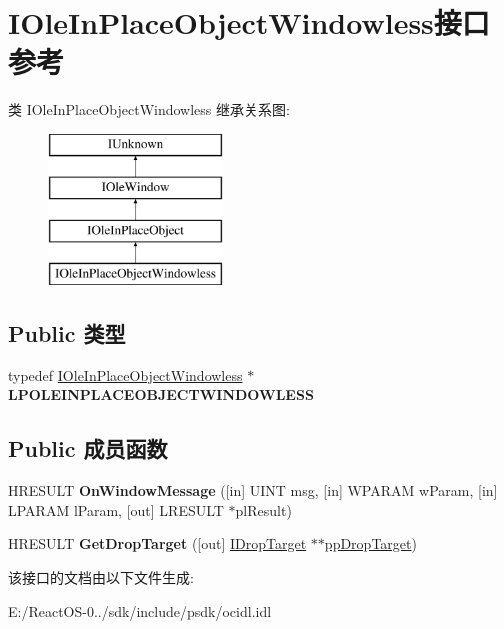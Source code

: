 \hypertarget{interface_i_ole_in_place_object_windowless}{}\section{I\+Ole\+In\+Place\+Object\+Windowless接口 参考}
\label{interface_i_ole_in_place_object_windowless}
类 I\+Ole\+In\+Place\+Object\+Windowless 继承关系图\+:\begin{figure}[H]
\begin{center}
\leavevmode
\includegraphics[height=4.000000cm]{interface_i_ole_in_place_object_windowless}
\end{center}
\end{figure}
\subsection*{Public 类型}
\begin{DoxyCompactItemize}
\item 
\mbox{\label{interface_i_ole_in_place_object_windowless_ae566c81e32281296b25d9df1fd01f42e}} 
typedef \hyperlink{interface_i_ole_in_place_object_windowless}{I\+Ole\+In\+Place\+Object\+Windowless} $\ast$ {\bfseries L\+P\+O\+L\+E\+I\+N\+P\+L\+A\+C\+E\+O\+B\+J\+E\+C\+T\+W\+I\+N\+D\+O\+W\+L\+E\+SS}
\end{DoxyCompactItemize}
\subsection*{Public 成员函数}
\begin{DoxyCompactItemize}
\item 
\mbox{\label{interface_i_ole_in_place_object_windowless_aae7be2beea1efe522aa3fbbb37351db0}} 
H\+R\+E\+S\+U\+LT {\bfseries On\+Window\+Message} (\mbox{[}in\mbox{]} U\+I\+NT msg, \mbox{[}in\mbox{]} W\+P\+A\+R\+AM w\+Param, \mbox{[}in\mbox{]} L\+P\+A\+R\+AM l\+Param, \mbox{[}out\mbox{]} L\+R\+E\+S\+U\+LT $\ast$pl\+Result)
\item 
\mbox{\label{interface_i_ole_in_place_object_windowless_a8e9dd4b66ec67d4523428b5e700e570d}} 
H\+R\+E\+S\+U\+LT {\bfseries Get\+Drop\+Target} (\mbox{[}out\mbox{]} \hyperlink{interface_i_drop_target}{I\+Drop\+Target} $\ast$$\ast$\hyperlink{interface_i_drop_target}{pp\+Drop\+Target})
\end{DoxyCompactItemize}


该接口的文档由以下文件生成\+:\begin{DoxyCompactItemize}
\item 
E\+:/\+React\+O\+S-\/0../sdk/include/psdk/ocidl.\+idl\end{DoxyCompactItemize}
